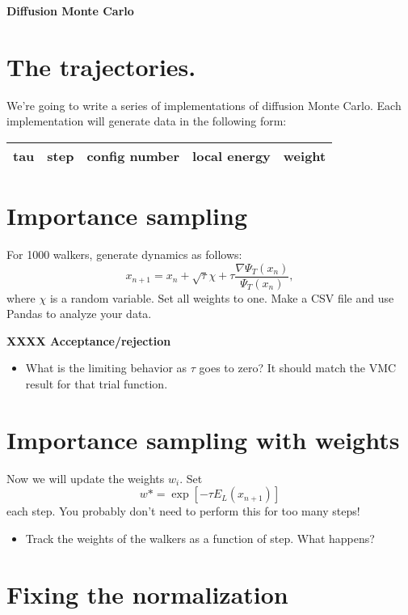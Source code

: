 \documentclass[12pt]{article}
\begin{document}
	{\bf Diffusion Monte Carlo } 

\section*{The trajectories.} 

We're going to write a series of implementations of diffusion Monte Carlo.
Each implementation will generate data in the following form: 

\begin{tabular}{ccccc}
tau&step&config number&	local energy&weight\\
\hline
\end{tabular}


	
\section{Importance sampling} 

For 1000 walkers, generate dynamics as follows: 
\begin{equation}
x_{n+1} = x_n + \sqrt{\tau}\chi + \tau \frac{\nabla \Psi_T(x_n)}{\Psi_T(x_n)},
\end{equation}
where $\chi$ is a random variable. 
Set all weights to one.
Make a CSV file and use Pandas to analyze your data. 

{\bf XXXX Acceptance/rejection } 

\begin{itemize}
\item What is the limiting behavior as $\tau$ goes to zero? It should match the VMC result for that trial function.	
\end{itemize}

\section{Importance sampling with weights}
Now we will update the weights $w_i$. Set 
\begin{equation}
w*=	\exp[-\tau E_L(x_{n+1})] 
\end{equation}
each step.
You probably don't need to perform this for too many steps!

\begin{itemize}
\item Track the weights of the walkers as a function of step. What happens?
\end{itemize}

\section{Fixing the normalization}
\end{document}
